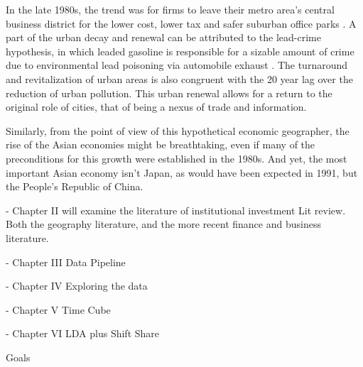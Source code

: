 In the late 1980s, the trend was for firms to leave their metro area's central business district for the lower cost, lower tax and safer suburban office parks \citep{bodenmanfirm2000}.  A part of the urban decay and renewal can be attributed to the lead-crime hypothesis, in which leaded gasoline is responsible for a sizable amount of crime due to environmental lead poisoning via automobile exhaust \citep{feigenbaum2016lead,NBERw23392}.  The turnaround and revitalization of urban areas is also congruent with the 20 year lag over the reduction of urban pollution.  This urban renewal allows for a return to the original role of cities, that of being a nexus of trade and information. 

Similarly, from the point of view of this hypothetical economic geographer, the rise of the Asian economies might be breathtaking, even if many of the preconditions for this growth were established in the 1980s.  And yet, the most important Asian economy isn't Japan, as would have been expected in 1991, but the People's Republic of China. 












- Chapter II will examine the literature of institutional investment Lit review.  Both the geography literature, and the more recent finance and business literature.   

- Chapter III Data Pipeline

- Chapter IV Exploring the data 

- Chapter V Time Cube

- Chapter VI LDA plus Shift Share

Goals 